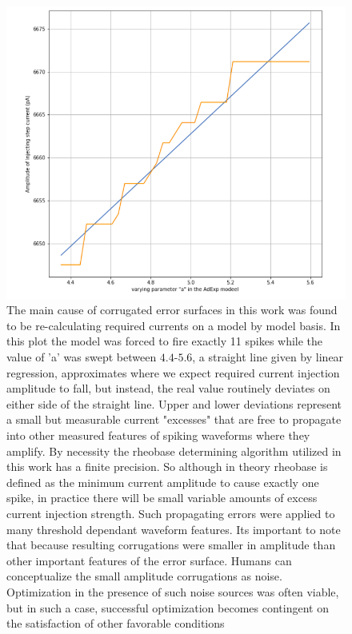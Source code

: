 \begin{center}
\begin{figure}
\includegraphics[]{figures/fundamental_cause_of_corrogations.png}
\caption[]{The main cause of corrugated error surfaces in this work was found to be re-calculating required currents on a model by model basis. In this plot the model was forced to fire exactly 11 spikes while the value of 'a' was swept between $4.4$-$5.6$, a straight line given by linear regression, approximates where we expect required current injection amplitude to fall, but instead, the real value routinely deviates on either side of the straight line. Upper and lower deviations represent a small but measurable current "excesses" that are free to propagate into other measured features of spiking waveforms where they amplify. By necessity the rheobase determining algorithm utilized in this work has a finite precision. So although in theory rheobase is defined as the minimum current amplitude to cause exactly one spike, in practice there will be small variable amounts of excess current injection strength. Such propagating errors were applied to many threshold dependant waveform features. Its important to note that because resulting corrugations were smaller in amplitude than other important features of the error surface. Humans can conceptualize the small amplitude corrugations as noise. Optimization in the presence of such noise sources was often viable, but in such a case, successful optimization becomes contingent on the satisfaction of other favorable conditions}
\label{fig:contingent_discontinous}
\end{figure}
\end{center}


